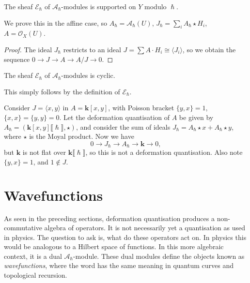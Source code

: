     
    \begin{corollary}
    The sheaf \( \mathcal{E}_{\hslash}\) of \( \mathcal{A}_\hslash\)-modules is supported on \( Y\) modulo \(\hslash\). 
    \end{corollary} 
    We prove this in the affine case, so \(A_{\hslash}=  \mathcal{A}_\hslash(U)\), \( J_{\hslash} = \sum_i A_{\hslash} \star H_i \), \(A =  \mathcal{O}_X(U) \). 
    \begin{proof}
    The ideal \( J_{\hslash}\) restricts to an ideal \( J = \sum A \cdot H_i \cong \langle J_i \rangle \), so we obtain the sequence \( 0 \rightarrow J \rightarrow A \rightarrow A/J \rightarrow 0 \).
    \end{proof}
    
    \begin{corollary}
    The sheaf \( \mathcal{E}_{\hslash}\) of \( \mathcal{A}_\hslash\)-modules is cyclic.
    \end{corollary}
    This simply follows by the definition of \( \mathcal{E}_{\hslash}\).
    
    \begin{ex}
    Consider \(J = \langle x,y \rangle \) in \( A=\mathbf{k}[x,y]\), with Poisson bracket \( \{ y,x\}=1\), \( \{ x,x\}=\{y,y\}=0\). Let the deformation quantisation of \(A\) be given by \(A_{\hslash} = (\mathbf{k}[x,y]\lBrack\hslash\rBrack,\star)\), and consider the sum of ideals  \( J_{\hslash}  = A_{\hslash} \star  x + A_{\hslash} \star y \), where \( \star \) is the Moyal product. Now we have
    \[ 0 \rightarrow J_{\hslash} \rightarrow A_{\hslash} \rightarrow \mathbf{k} \rightarrow 0, \]
    but \( \mathbf{k}\) is not flat over \( \mathbf{k} \lBrack \hslash \rBrack\), so this is not a deformation quantisation.
    Also note \( \{y,x\} = 1\), and \(1 \notin J\).
    \end{ex}
    
    


    \section{Wavefunctions}
    \label{sec:wavefunctions} 
    As seen in the preceding sections, deformation quantisation produces a non-commutative algebra of operators. It is not necessarily yet a quantisation as used in physics. The question to ask is, what do these operators act on. In physics this would be analogous to a Hilbert space of functions. In this more algebraic context, it is a dual \( \mathcal{A}_{\hslash}\)-module. These dual modules define the objects known as \emph{wavefunctions}, where the word has the same meaning in quantum curves and topological recursion.  
    
